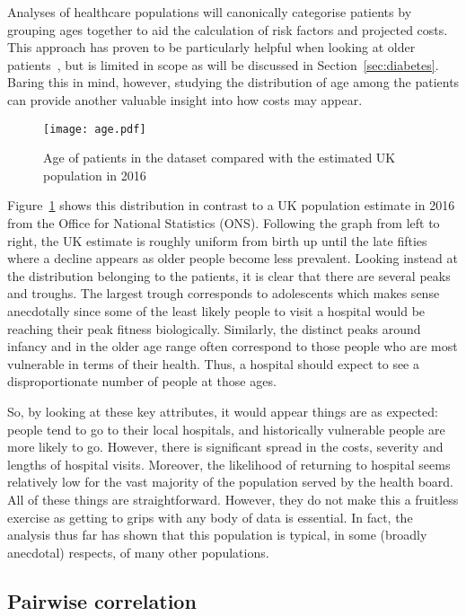 Analyses of healthcare populations will canonically categorise patients by
grouping ages together to aid the calculation of risk factors and projected
costs. This approach has proven to be particularly helpful when looking at older
patients~\cite{Billings327}, but is limited in scope as will be discussed in
Section~\ref{sec:diabetes}. Baring this in mind, however, studying the
distribution of age among the patients can provide another valuable insight into
how costs may appear.

\begin{figure}
    \centering
    \texttt{[image: age.pdf]}
    \caption{%
        Age of patients in the dataset compared with the estimated UK population
        in 2016
    }\label{fig:age}
\end{figure}

Figure~\ref{fig:age} shows this distribution in contrast to a UK population
estimate in 2016 from the Office for National Statistics (ONS). Following the
graph from left to right, the UK estimate is roughly uniform from birth up until
the late fifties where a decline appears as older people become less prevalent.
Looking instead at the distribution belonging to the patients, it is clear that
there are several peaks and troughs. The largest trough corresponds to
adolescents which makes sense anecdotally since some of the least likely people
to visit a hospital would be reaching their peak fitness biologically.
Similarly, the distinct peaks around infancy and in the older age range often
correspond to those people who are most vulnerable in terms of their health.
Thus, a hospital should expect to see a disproportionate number of people at
those ages.

So, by looking at these key attributes, it would appear things are as expected:
people tend to go to their local hospitals, and historically vulnerable people
are more likely to go. However, there is significant spread in the costs,
severity and lengths of hospital visits. Moreover, the likelihood of returning
to hospital seems relatively low for the vast majority of the population served
by the health board. All of these things are straightforward. However, they do
not make this a fruitless exercise as getting to grips with any body of data is
essential. In fact, the analysis thus far has shown that this population is
typical, in some (broadly anecdotal) respects, of many other populations.


\subsection{Pairwise correlation}\label{subsec:corr}

